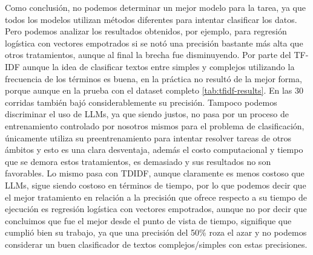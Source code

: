 \documentclass[12pt]{article}
\begin{document}
Como conclusión, no podemos determinar un mejor modelo para la tarea, ya que todos los modelos utilizan métodos diferentes para intentar clasificar los datos. Pero podemos analizar los resultados obtenidos, por ejemplo, para regresión logística con vectores empotrados si se notó una precisión bastante más alta que otros tratamientos, aunque al final la brecha fue disminuyendo. Por parte del TF-IDF aunque la idea de clasificar textos entre simples y complejos utilizando la frecuencia de los términos es buena, en la práctica no resultó de la mejor forma, porque aunque en la prueba con el dataset completo \ref{tab:tfidf-results}. En las 30 corridas también bajó considerablemente su precisión. Tampoco podemos discriminar el uso de LLMs, ya que siendo justos, no pasa por un proceso de entrenamiento controlado por nosotros mismos para el problema de clasificación, únicamente utiliza su preentrenamiento para intentar resolver tareas de otros ámbitos y esto es una clara desventaja, además el costo computacional y tiempo que se demora estos tratamientos, es demasiado y sus resultados no son favorables. Lo mismo pasa con TDIDF, aunque claramente es menos costoso que LLMs, sigue siendo costoso en términos de tiempo, por lo que podemos decir que el mejor tratamiento en relación a la precisión que ofrece respecto a su tiempo de ejecución es regresión logística con vectores empotrados, aunque no por decir que concluimos que fue el mejor desde el punto de vista de tiempo, signifique que cumplió bien su trabajo, ya que una precisión del 50\% roza el azar y no podemos considerar un buen clasificador de textos complejos/simples con estas precisiones.



\end{document}
